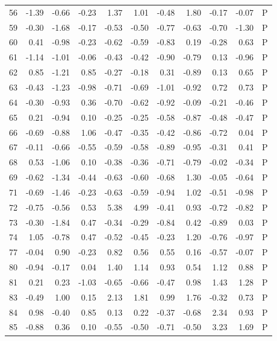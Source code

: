 \begin{table}[ht]
\begin{tabular}{rrrrrrrrrrl}
  56 & -1.39 & -0.66 & -0.23 & 1.37 & 1.01 & -0.48 & 1.80 & -0.17 & -0.07 & P \\ 
  59 & -0.30 & -1.68 & -0.17 & -0.53 & -0.50 & -0.77 & -0.63 & -0.70 & -1.30 & P \\ 
  60 & 0.41 & -0.98 & -0.23 & -0.62 & -0.59 & -0.83 & 0.19 & -0.28 & 0.63 & P \\ 
  61 & -1.14 & -1.01 & -0.06 & -0.43 & -0.42 & -0.90 & -0.79 & 0.13 & -0.96 & P \\ 
  62 & 0.85 & -1.21 & 0.85 & -0.27 & -0.18 & 0.31 & -0.89 & 0.13 & 0.65 & P \\ 
  63 & -0.43 & -1.23 & -0.98 & -0.71 & -0.69 & -1.01 & -0.92 & 0.72 & 0.73 & P \\ 
  64 & -0.30 & -0.93 & 0.36 & -0.70 & -0.62 & -0.92 & -0.09 & -0.21 & -0.46 & P \\ 
  65 & 0.21 & -0.94 & 0.10 & -0.25 & -0.25 & -0.58 & -0.87 & -0.48 & -0.47 & P \\ 
  66 & -0.69 & -0.88 & 1.06 & -0.47 & -0.35 & -0.42 & -0.86 & -0.72 & 0.04 & P \\ 
  67 & -0.11 & -0.66 & -0.55 & -0.59 & -0.58 & -0.89 & -0.95 & -0.31 & 0.41 & P \\ 
  68 & 0.53 & -1.06 & 0.10 & -0.38 & -0.36 & -0.71 & -0.79 & -0.02 & -0.34 & P \\ 
  69 & -0.62 & -1.34 & -0.44 & -0.63 & -0.60 & -0.68 & 1.30 & -0.05 & -0.64 & P \\ 
  71 & -0.69 & -1.46 & -0.23 & -0.63 & -0.59 & -0.94 & 1.02 & -0.51 & -0.98 & P \\ 
  72 & -0.75 & -0.56 & 0.53 & 5.38 & 4.99 & -0.41 & 0.93 & -0.72 & -0.82 & P \\ 
  73 & -0.30 & -1.84 & 0.47 & -0.34 & -0.29 & -0.84 & 0.42 & -0.89 & 0.03 & P \\ 
  74 & 1.05 & -0.78 & 0.47 & -0.52 & -0.45 & -0.23 & 1.20 & -0.76 & -0.97 & P \\ 
  77 & -0.04 & 0.90 & -0.23 & 0.82 & 0.56 & 0.55 & 0.16 & -0.57 & -0.07 & P \\ 
  80 & -0.94 & -0.17 & 0.04 & 1.40 & 1.14 & 0.93 & 0.54 & 1.12 & 0.88 & P \\ 
  81 & 0.21 & 0.23 & -1.03 & -0.65 & -0.66 & -0.47 & 0.98 & 1.43 & 1.28 & P \\ 
  83 & -0.49 & 1.00 & 0.15 & 2.13 & 1.81 & 0.99 & 1.76 & -0.32 & 0.73 & P \\ 
  84 & 0.98 & -0.40 & 0.85 & 0.13 & 0.22 & -0.37 & -0.68 & 2.34 & 0.93 & P \\ 
  85 & -0.88 & 0.36 & 0.10 & -0.55 & -0.50 & -0.71 & -0.50 & 3.23 & 1.69 & P \\ 

\end{tabular}
\end{table}
